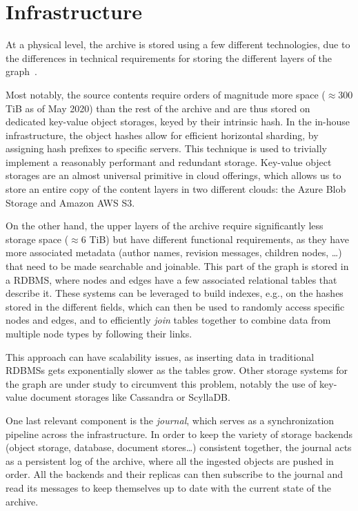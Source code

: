 \section{Infrastructure}
\label{sec:swh-infrastructure}

At a physical level, the archive is stored using a few different technologies,
due to the differences in technical requirements for storing the different
layers of the graph~\cite{swhipres2017}.

Most notably, the source contents require orders of magnitude more space
($\approx 300$ TiB as of May 2020) than the rest of the archive and are thus
stored on dedicated key-value object storages, keyed by their intrinsic hash.
In the in-house infrastructure, the object hashes allow for efficient
horizontal sharding, by assigning hash prefixes to specific servers. This
technique is used to trivially implement a reasonably performant and redundant
storage.
Key-value object storages are an almost universal primitive in cloud offerings,
which allows us to store an entire copy of the content layers in two different
clouds: the Azure Blob Storage and Amazon AWS S3.

On the other hand, the upper layers of the archive require significantly less
storage space ($\approx 6$ TiB) but have different functional requirements, as
they have more associated metadata (author names, revision messages, children
nodes, …) that need to be made searchable and joinable. This part of the graph
is stored in a \gls{RDBMS}, where nodes and edges have a few associated
relational tables that describe it. These systems can be leveraged to build
indexes, e.g., on the hashes stored in the different fields, which can then be
used to randomly access specific nodes and edges, and to efficiently
\emph{join} tables together to combine data from multiple node types by
following their links.

This approach can have scalability issues, as inserting data in traditional
\glspl{RDBMS} gets exponentially slower as the tables grow.  Other storage
systems for the graph are under study to circumvent this problem, notably the
use of key-value document storages like Cassandra or ScyllaDB.

One last relevant component is the \emph{journal}, which serves as a
synchronization pipeline across the infrastructure. In order to keep the
variety of storage backends (object storage, database, document stores…)
consistent together, the journal acts as a persistent log of the archive, where
all the ingested objects are pushed in order. All the backends and their
replicas can then subscribe to the journal and read its messages to keep
themselves up to date with the current state of the archive.
